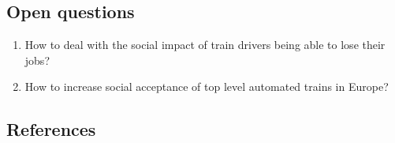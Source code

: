 \documentclass[
]{book}
\providecommand{\tightlist}{%
  \setlength{\itemsep}{0pt}\setlength{\parskip}{0pt}}
\begin{document}
\hypertarget{open-questions-40}{%
\subsection*{Open questions}\label{open-questions-40}}

\begin{enumerate}
\def\labelenumi{\arabic{enumi}.}
\tightlist
\item
  How to deal with the social impact of train drivers being able to lose their jobs?
\item
  How to increase social acceptance of top level automated trains in Europe?
\end{enumerate}

\hypertarget{references-40}{%
\subsection*{References}\label{references-40}}
\end{document}
